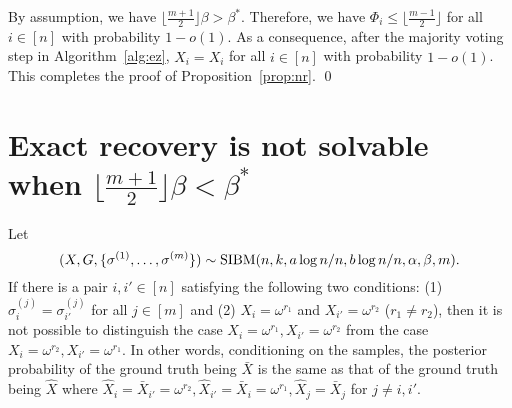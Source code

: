 \documentclass{article}
\begin{document}
By assumption, we have $\lfloor \frac{m+1}{2} \rfloor \beta>\beta^\ast$.
Therefore, we have $\Phi_i\le \lfloor \frac{m-1}{2} \rfloor$ for all $i\in[n]$ with probability $1-o(1)$.
As a consequence, after the majority voting step in Algorithm~\ref{alg:ez}, $\hat{X}_i=X_i$ for all $i\in[n]$ with probability $1-o(1)$. This completes the proof of Proposition~\ref{prop:nr}.
\hfill\qed
\section{Exact recovery is not solvable when $\lfloor \frac{m+1}{2} \rfloor \beta < \beta^\ast$}\label{sect:converse}

\begin{lemma} \label{lm:qq}
	Let 
	$$
	(X,G,\{\sigma^{(1)},\dots,\sigma^{(m)}\})\sim \operatorname{SIBM}(n,k,a\log n/n, b\log n/n,\alpha,\beta, m) .
	$$
	If there is a pair $i, i'\in[n]$ satisfying the following two conditions: (1) $\sigma_{i}^{(j)}=\sigma_{i'}^{(j)}$ for all $j\in[m]$ and (2) $X_i = \omega^{r_1}$ and $X_{i'} = \omega^{r_2}$ ($r_1 \neq r_2$), then it is not possible to distinguish
	the case $X_i = \omega^{r_1}, X_{i'} = \omega^{r_2}$
	from the case $X_i = \omega^{r_2}, X_{i'} = \omega^{r_1}$.
	In other words, conditioning on the samples, the posterior probability of the ground truth being $\bar{X}$ is the same as that of the ground truth being $\hat{X}$ where $\hat{X}_{i} = \bar{X}_{i'}= \omega^{r_2}, \hat{X}_{i'} = \bar{X}_{i} = \omega^{r_1}, \hat{X}_j = \bar{X}_j$ for $j\neq i,i'$.
\end{lemma}
\end{document}
